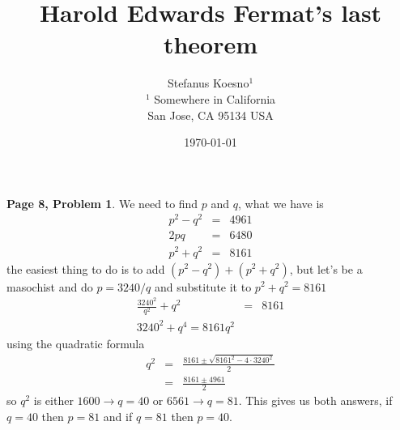 \documentclass[aps,preprint,preprintnumbers,nofootinbib,showpacs,prd]{revtex4-1}
\newcommand{\nbea}{\begin{eqnarray*}}
\newcommand{\neea}{\end{eqnarray*}}
\begin{document}
\title{Harold Edwards Fermat's last theorem}
\bigskip
\author{Stefanus Koesno$^1$\\
$^1$ Somewhere in California\\ San Jose, CA 95134 USA\\
}
%
\date{\today}
%
\begin{abstract}

\end{abstract}
%
\maketitle

\renewcommand{\theequation}{A.\arabic{equation}}  %
\setcounter{equation}{0}  %

{\bf Page 8, Problem 1}. We need to find $p$ and $q$, what we have is
%
\nbea
p^2 - q^2 & = & 4961 \\
2pq & = & 6480 \\
p^2 + q^2 & = & 8161
\neea
%
the easiest thing to do is to add $(p^2 - q^2) + (p^2 + q^2)$, but let's be a masochist and do $p = 3240/q$ and substitute it to $p^2 + q^2 = 8161$
%
\nbea
\frac{3240^2}{q^2} + q^2 & = & 8161 \\
3240^2 + q^4 = 8161 q^2
\neea
%
using the quadratic formula
%
\nbea
q^2 & = & \frac{8161 \pm \sqrt{8161^2 - 4\cdot 3240^2}}{2} \\
& = & \frac{8161 \pm 4961}{2}
\neea
%
so $q^2$ is either $1600 \to q = 40$ or $6561 \to q = 81$. This gives us both answers, if $q = 40$ then $p = 81$ and if $q = 81$ then $p = 40$.
\end{document}
